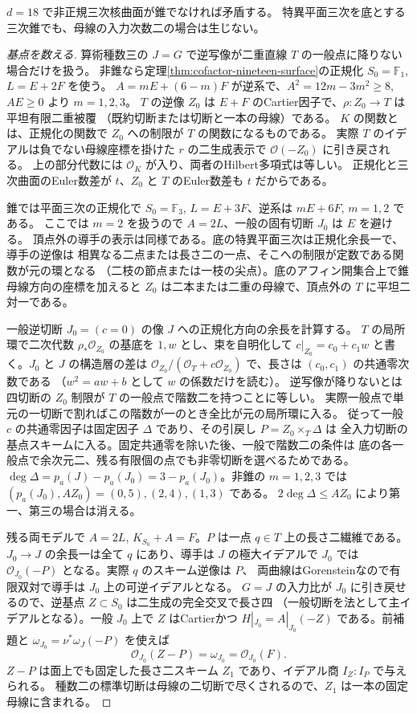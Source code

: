 \begin{theorem}\label{thm:cofactor-cubic-conductor-base}
$d=18$ で非正規三次核曲面が錐でなければ矛盾する。
特異平面三次を底とする三次錐でも、母線の入力次数二の場合は生じない。
\end{theorem}
\begin{proof}[基点を数える]
算術種数三の $J=G$ で逆写像が二重直線 $T$ の一般点に降りない場合だけを扱う。
非錐なら定理\ref{thm:cofactor-nineteen-surface}の正規化 $S_0=\mathbb F_1$, $L=E+2F$ を使う。
$A=mE+(6-m)F$ が逆系で、$A^2=12m-3m^2\ge8$, $AE\ge0$ より $m=1,2,3$。
$T$ の逆像 $Z_0$ は $E+F$ のCartier因子で、$\rho:Z_0\to T$ は平坦有限二重被覆
（既約切断または切断と一本の母線）である。
$K$ の関数とは、正規化の関数で $Z_0$ への制限が $T$ の関数になるものである。
実際 $T$ のイデアルは負でない母線座標を掛けた $r$ の二生成表示で $\mathcal O(-Z_0)$ に引き戻される。
上の部分代数には $\mathcal O_K$ が入り、両者のHilbert多項式は等しい。
正規化と三次曲面のEuler数差が $t$、$Z_0$ と $T$ のEuler数差も $t$ だからである。

錐では平面三次の正規化で $S_0=\mathbb F_3$, $L=E+3F$、逆系は $mE+6F$, $m=1,2$ である。
ここでは $m=2$ を扱うので $A=2L$、一般の固有切断 $J_0$ は $E$ を避ける。
頂点外の導手の表示は同様である。底の特異平面三次は正規化余長一で、導手の逆像は
相異なる二点または長さ二の一点、そこへの制限が定数である関数が元の環となる
（二枝の節点または一枝の尖点）。底のアフィン開集合上で錐母線方向の座標を加えると
$Z_0$ は二本または二重の母線で、頂点外の $T$ に平坦二対一である。

一般逆切断 $J_0=(c=0)$ の像 $J$ への正規化方向の余長を計算する。
$T$ の局所環で二次代数 $\rho_*\mathcal O_{Z_0}$ の基底を $1,w$ とし、束を自明化して
$c|_{Z_0}=c_0+c_1w$ と書く。$J_0$ と $J$ の構造層の差は
$\mathcal O_{Z_0}/(\mathcal O_T+c\mathcal O_{Z_0})$ で、長さは $(c_0,c_1)$ の共通零次数である
（$w^2=aw+b$ として $w$ の係数だけを読む）。
逆写像が降りないとは四切断の $Z_0$ 制限が $T$ の一般点で階数二を持つことに等しい。
実際一般点で単元の一切断で割ればこの階数が一のとき全比が元の局所環に入る。
従って一般 $c$ の共通零因子は固定因子 $\Delta$ であり、その引戻し $P=Z_0\times_T\Delta$ は
全入力切断の基点スキームに入る。固定共通零を除いた後、一般で階数二の条件は
底の各一般点で余次元二、残る有限個の点でも非零切断を選べるためである。
$\deg\Delta=p_a(J)-p_a(J_0)=3-p_a(J_0)$。非錐の $m=1,2,3$ では
$(p_a(J_0),AZ_0)=(0,5),(2,4),(1,3)$ である。
$2\deg\Delta\le AZ_0$ により第一、第三の場合は消える。

残る両モデルで $A=2L$, $K_{S_0}+A=F$。$P$ は一点 $q\in T$ 上の長さ二繊維である。
$J_0\to J$ の余長一は全て $q$ にあり、導手は $J$ の極大イデアルで
$J_0$ では $\mathcal O_{J_0}(-P)$ となる。実際 $q$ のスキーム逆像は $P$、
両曲線はGorensteinなので有限双対で導手は $J_0$ 上の可逆イデアルとなる。
$G=J$ の入力比が $J_0$ に引き戻せるので、逆基点 $Z\subset S_0$ は二生成の完全交叉で長さ四
（一般切断を法として主イデアルとなる）。一般 $J_0$ 上で $Z$ はCartierかつ
$H|_{J_0}=A|_{J_0}(-Z)$ である。前補題と
$\omega_{J_0}=\nu^*\omega_J(-P)$ を使えば
\[
        \mathcal O_{J_0}(Z-P)=\omega_{J_0}=\mathcal O_{J_0}(F).
\]
$Z-P$ は面上でも固定した長さ二スキーム $Z_1$ であり、イデアル商 $I_Z:I_P$ で与えられる。
種数二の標準切断は母線の二切断で尽くされるので、$Z_1$ は一本の固定母線に含まれる。
\end{proof}

